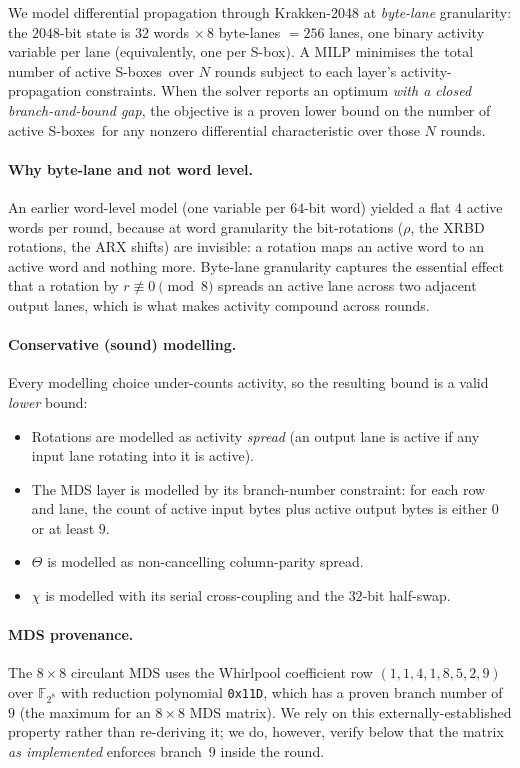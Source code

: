 \documentclass[11pt,a4paper]{article}
\newcommand{\sbx}{\textsf{S-box}}
\newcommand{\sbxes}{\textsf{S-boxes}}
\begin{document}
We model differential propagation through Krakken-2048 at \emph{byte-lane}
granularity: the $2048$-bit state is $32$ words $\times\,8$ byte-lanes
$=256$ lanes, one binary activity variable per lane (equivalently, one per
\sbx). A MILP minimises the total number of active \sbxes\ over $N$ rounds
subject to each layer's activity-propagation constraints. When the solver
reports an optimum \emph{with a closed branch-and-bound gap}, the objective is a
proven lower bound on the number of active \sbxes\ for any nonzero differential
characteristic over those $N$ rounds.

\paragraph{Why byte-lane and not word level.}
An earlier word-level model (one variable per $64$-bit word) yielded a flat
$4$ active words per round, because at word granularity the bit-rotations
($\rho$, the XRBD rotations, the ARX shifts) are invisible: a rotation maps an
active word to an active word and nothing more. Byte-lane granularity captures
the essential effect that a rotation by $r\not\equiv 0 \pmod 8$ spreads an active
lane across two adjacent output lanes, which is what makes activity compound
across rounds.

\paragraph{Conservative (sound) modelling.}
Every modelling choice under-counts activity, so the resulting bound is a valid
\emph{lower} bound:
\begin{itemize}\itemsep2pt
  \item Rotations are modelled as activity \emph{spread} (an output lane is
        active if any input lane rotating into it is active).
  \item The MDS layer is modelled by its branch-number constraint: for each row
        and lane, the count of active input bytes plus active output bytes is
        either $0$ or at least $9$.
  \item $\Theta$ is modelled as non-cancelling column-parity spread.
  \item $\chi$ is modelled with its serial cross-coupling and the $32$-bit
        half-swap.
\end{itemize}

\paragraph{MDS provenance.}
The $8\times 8$ circulant MDS uses the Whirlpool coefficient row
$(1,1,4,1,8,5,2,9)$ over $\mathbb{F}_{2^8}$ with reduction polynomial
\texttt{0x11D}, which has a proven branch number of $9$ (the maximum for an
$8\times 8$ MDS matrix). We rely on this externally-established property rather
than re-deriving it; we do, however, verify below that the matrix \emph{as
implemented} enforces branch~$9$ inside the round.
\end{document}
